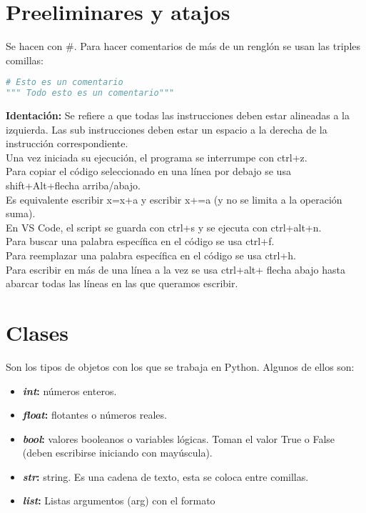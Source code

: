 \documentclass[10pt,oneside]{article}
\begin{document}
    \begin{multicols}{2} \tableofcontents
        \section{Preeliminares y atajos}
            Se hacen con \#. Para hacer comentarios de más de un renglón se usan las triples comillas:
    
            \begin{lstlisting}[language=Python]
# Esto es un comentario
""" Todo esto es un comentario"""
            \end{lstlisting}
    
            \textbf{Identación:} Se refiere a que todas las instrucciones deben estar alineadas a la izquierda. Las sub instrucciones deben estar un espacio a la derecha de la instrucción correspondiente.\\\newline Una vez iniciada su ejecución, el programa se interrumpe con ctrl+z. \\ \newline Para copiar el código seleccionado en una línea por debajo se usa shift+Alt+flecha arriba/abajo. \\ \newline Es equivalente escribir x=x+a y escribir x+=a (y no se limita a la operación suma). \\ \newline En VS Code, el script se guarda con ctrl+s y se ejecuta con ctrl+alt+n. \\ \newline Para buscar una palabra específica en el código se usa ctrl+f. \\ \newline Para reemplazar una palabra específica en el código se usa ctrl+h. \\\newline Para escribir en más de una línea a la vez se usa ctrl+alt+ flecha abajo hasta abarcar todas las líneas en las que queramos escribir.

        \section{Clases}
            Son los tipos de objetos con los que se trabaja en Python. Algunos de ellos son:

            \begin{itemize}
                \item \textbf{\textit{int}:} números enteros.
                \item \textbf{\textit{float}:} flotantes o números reales.
                \item \textbf{\textit{bool}:} valores booleanos o variables lógicas. Toman el valor True o False (deben escribirse iniciando con mayúscula).
                \item \textbf{\textit{str}:} string. Es una cadena de texto, esta se coloca entre comillas. 
                \item \textbf{\textit{list}:} Listas argumentos (arg) con el formato 
                

\end{itemize}
\end{multicols}
\end{document}
